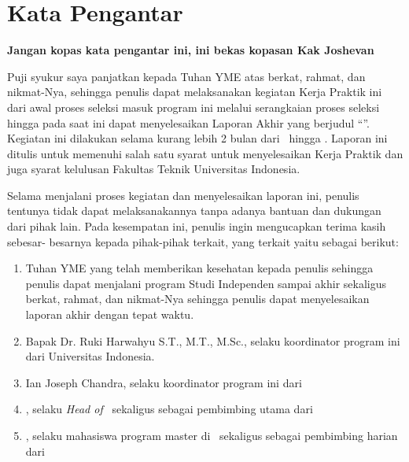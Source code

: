 \chapter*{Kata Pengantar}

\begin{center}
        \large \textbf{Jangan kopas kata pengantar ini, ini bekas kopasan Kak Joshevan}
\end{center}

Puji syukur saya panjatkan kepada Tuhan YME atas berkat, rahmat, dan
nikmat-Nya, sehingga penulis dapat melaksanakan kegiatan Kerja Praktik ini dari
awal proses seleksi masuk program ini melalui serangkaian proses seleksi hingga
pada saat ini dapat menyelesaikan Laporan Akhir yang berjudul “\judul”. Kegiatan ini dilakukan selama
kurang lebih 2 bulan dari \startMagang \ hingga \akhirMagang. Laporan ini ditulis
untuk memenuhi salah satu syarat untuk menyelesaikan Kerja Praktik dan juga
syarat kelulusan Fakultas Teknik Universitas Indonesia.

Selama menjalani proses kegiatan dan menyelesaikan laporan ini, penulis
tentunya tidak dapat melaksanakannya tanpa adanya bantuan dan dukungan dari
pihak lain. Pada kesempatan ini, penulis ingin mengucapkan terima kasih sebesar-
besarnya kepada pihak-pihak terkait, yang terkait yaitu sebagai berikut:

\begin{enumerate}
	\item Tuhan YME yang telah memberikan kesehatan kepada penulis sehingga
        penulis dapat menjalani program Studi Independen sampai akhir
        sekaligus berkat, rahmat, dan nikmat-Nya sehingga penulis dapat
        menyelesaikan laporan akhir dengan tepat waktu.
	\item Bapak Dr. Ruki Harwahyu S.T., M.T., M.Sc., selaku koordinator
        program ini dari Universitas Indonesia.
	\item Ian Joseph Chandra, selaku koordinator program ini dari \namaUniv
	\item \pembimbingUtama, selaku 
        \textit{Head of }\namaLab \ sekaligus sebagai pembimbing utama dari \namaUniv
	\item \pembimbingHarian, selaku mahasiswa program master di \namaLab \ sekaligus sebagai pembimbing harian dari \namaUniv
\end{enumerate}

